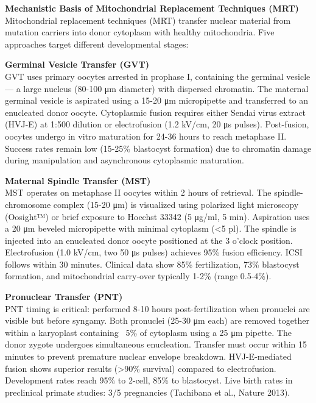 \begin{technical}
{\Large\textbf{Mechanistic Basis of Mitochondrial Replacement Techniques (MRT)}}\\[0.7em]

Mitochondrial replacement techniques (MRT) transfer nuclear material from mutation carriers into donor cytoplasm with healthy mitochondria. Five approaches target different developmental stages:

\textbf{Germinal Vesicle Transfer (GVT)}\\
GVT uses primary oocytes arrested in prophase I, containing the germinal vesicle — a large nucleus (80-100 μm diameter) with dispersed chromatin. The maternal germinal vesicle is aspirated using a 15-20 μm micropipette and transferred to an enucleated donor oocyte. Cytoplasmic fusion requires either Sendai virus extract (HVJ-E) at 1:500 dilution or electrofusion (1.2 kV/cm, 20 μs pulses). Post-fusion, oocytes undergo in vitro maturation for 24-36 hours to reach metaphase II. Success rates remain low (15-25\% blastocyst formation) due to chromatin damage during manipulation and asynchronous cytoplasmic maturation.

\textbf{Maternal Spindle Transfer (MST)}\\
MST operates on metaphase II oocytes within 2 hours of retrieval. The spindle-chromosome complex (15-20 μm) is visualized using polarized light microscopy (Oosight™) or brief exposure to Hoechst 33342 (5 μg/ml, 5 min). Aspiration uses a 20 μm beveled micropipette with minimal cytoplasm (<5 pl). The spindle is injected into an enucleated donor oocyte positioned at the 3 o'clock position. Electrofusion (1.0 kV/cm, two 50 μs pulses) achieves 95\% fusion efficiency. ICSI follows within 30 minutes. Clinical data show 85\% fertilization, 73\% blastocyst formation, and mitochondrial carry-over typically 1-2\% (range 0.5-4\%).

\textbf{Pronuclear Transfer (PNT)}\\
PNT timing is critical: performed 8-10 hours post-fertilization when pronuclei are visible but before syngamy. Both pronuclei (25-30 μm each) are removed together within a karyoplast containing ~5\% of cytoplasm using a 25 μm pipette. The donor zygote undergoes simultaneous enucleation. Transfer must occur within 15 minutes to prevent premature nuclear envelope breakdown. HVJ-E-mediated fusion shows superior results (>90\% survival) compared to electrofusion. Development rates reach 95\% to 2-cell, 85\% to blastocyst. Live birth rates in preclinical primate studies: 3/5 pregnancies (Tachibana et al., Nature 2013).


\end{technical}
